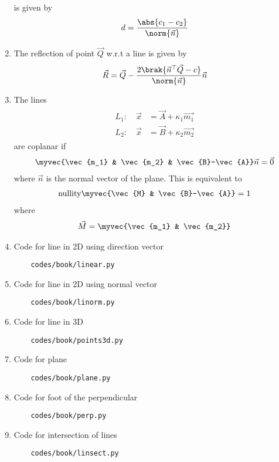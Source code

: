 \begin{enumerate}[label=\thesubsection.\arabic*.,ref=\thesubsection.\theenumi]
is given by 
\begin{align}
	\label{eq:dist_lines_2d}
	d = \frac{\abs{   c_1-c_2 }}{\norm{\vec{n}}}	
\end{align}
	\item 
The reflection of point $\vec{Q}$ w.r.t a line is given by
\begin{align}
	\label{eq:11/10/4/22}
\vec{R} = \vec{Q} -\frac{2\brak{\vec{n}^{\top}\vec{Q}-c}}{\norm{\vec{n}}}\vec{n}
\end{align}
	\item The lines
\begin{align}
\begin{split}
	L_1: \quad   \vec{x} &=\vec{A}+ \kappa_1\vec{m_1}
	\\
L_2: \quad        
	\vec{x} &= \vec{B}  + \kappa_2\vec{m_2} 
\end{split}
\end{align}
are coplanar if 
\begin{align}
 \myvec{\vec{m_1} & \vec{m_2}
	 & \vec{B}-\vec{A}}\vec{n} = \vec{0}
\end{align}
where $\vec{n}$ is the normal vector of the plane. This is equivalent to
\begin{align}
	\text{nullity}\myvec{\vec{M}  
	& \vec{B}-\vec{A}} =  1
\end{align}
where
\begin{align}
	\vec{M} = 
	\myvec{\vec{m_1} & \vec{m_2}} 
\end{align}
\item Code for line in 2D using direction vector
	\begin{lstlisting}
	codes/book/linear.py
\end{lstlisting}
\item Code for line in 2D using normal vector
	\begin{lstlisting}
	codes/book/linorm.py
\end{lstlisting}
\item Code for line in 3D
	\begin{lstlisting}
	codes/book/points3d.py
\end{lstlisting}
\item Code for plane
	\begin{lstlisting}
	codes/book/plane.py
\end{lstlisting}
\item Code for foot of the perpendicular
	\begin{lstlisting}
	codes/book/perp.py
\end{lstlisting}
\item Code for intersection of lines
	\begin{lstlisting}
	codes/book/linsect.py
\end{lstlisting}
\end{enumerate}
